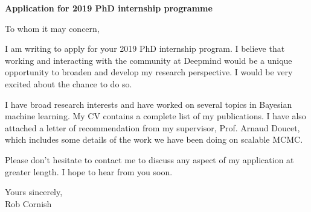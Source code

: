\documentclass[12pt,a4paper]{letter}
\begin{document}

\begin{letter}{\bf Application for 2019 PhD internship programme}
\opening{}

To whom it may concern,

\bigskip
I am writing to apply for your 2019 PhD internship program. I believe that working and
interacting with the community at Deepmind would be a unique opportunity to broaden and
develop my research perspective. I would be very excited about the chance to do so.

\bigskip
I have broad research interests and have worked on several topics in Bayesian machine
learning. My CV contains a complete list of my publications. I have also attached a letter
of recommendation from my supervisor, Prof. Arnaud Doucet, which includes some details of
the work we have been doing on scalable MCMC.

\bigskip
Please don't hesitate to contact me to discuss any aspect of my application at greater
length. I hope to hear from you soon.

\closing{
Yours sincerely,\\
\bigskip
Rob Cornish
}

\end{letter}
\end{document}
